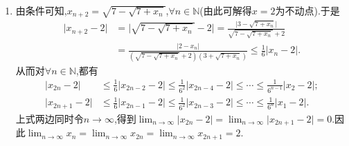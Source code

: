 \documentclass[../../main.tex]{subfiles}%
\begin{document}
\begin{solution}
\begin{enumerate}
{\color{blue}解法二(压缩映像):}不妨设$x_1>0$(用$x_2=\frac{1}{1+x_1}>0$代替$x_1$),归纳可知$x_n>0$.设$x=\frac{\sqrt{5}-1}{2}$,则
\begin{align*}
\left| x_{n+1}-x \right|=\left| \frac{1}{1+x_n}-x \right|=\left| \frac{1}{1+x_n}-\frac{1}{1+x} \right|=\frac{\left| x_n-x \right|}{\left( 1+x_n \right) \left( 1+x \right)}\leqslant \frac{1}{1+x}\left| x_n-x \right|.
\end{align*}
从而
\begin{align*}
\left| x_{n+1}-x \right|\leqslant \frac{1}{1+x}\left| x_n-x \right|\leqslant \frac{1}{\left( 1+x \right) ^2}\left| x_{n-1}-x \right|\leqslant \cdots \leqslant \frac{1}{\left( 1+x \right) ^n}\left| x_1-x \right|.
\end{align*}
于是令$n\to\infty$,得到$\underset{n\rightarrow \infty}{\lim}\left| x_{n+1}-x \right|=0$,因此$\underset{n\rightarrow \infty}{\lim}x_n=x=\frac{\sqrt{5}-1}{2}$.

\item 由条件可知,\(x_{n + 2}=\sqrt{7-\sqrt{7 + x_n}}\),\(\forall n\in\mathbb{N}\)(由此可解得\(x = 2\)为不动点).于是
\begin{align*}
\vert x_{n + 2}-2\vert&=\vert\sqrt{7-\sqrt{7 + x_n}}-2\vert
=\frac{\vert 3-\sqrt{7 + x_n}\vert}{\sqrt{7-\sqrt{7 + x_n}}+2}\\
&=\frac{\vert 2 - x_n\vert}{(\sqrt{7-\sqrt{7 + x_n}}+2)(3+\sqrt{7 + x_n})}
\leqslant\frac{1}{6}\vert x_n - 2\vert.
\end{align*}
从而对$\forall n \in \mathbb{N}$,都有
\begin{align*}
\vert x_{2n}-2\vert&\leqslant\frac{1}{6}\vert x_{2n - 2}-2\vert\leqslant\frac{1}{6^2}\vert x_{2n - 4}-2\vert\leqslant\cdots\leqslant\frac{1}{6^{n - 1}}\vert x_2 - 2\vert;\\
\vert x_{2n + 1}-2\vert&\leqslant\frac{1}{6}\vert x_{2n - 1}-2\vert\leqslant\frac{1}{6^2}\vert x_{2n - 3}-2\vert\leqslant\cdots\leqslant\frac{1}{6^n}\vert x_1 - 2\vert.
\end{align*}
上式两边同时令\(n\rightarrow\infty\),得到\(\lim_{n\rightarrow\infty}\vert x_{2n}-2\vert=\lim_{n\rightarrow\infty}\vert x_{2n + 1}-2\vert = 0\).因此\(\lim_{n\rightarrow\infty}x_n=\lim_{n\rightarrow\infty}x_{2n}=\lim_{n\rightarrow\infty}x_{2n + 1}=2\).
\end{enumerate}

\end{solution}
\end{document}
